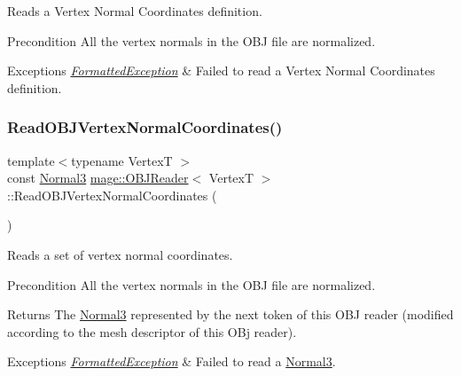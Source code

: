 Reads a Vertex Normal Coordinates definition.

\begin{DoxyPrecond}{Precondition}
All the vertex normals in the O\+BJ file are normalized. 
\end{DoxyPrecond}

\begin{DoxyExceptions}{Exceptions}
{\em \hyperlink{structmage_1_1_formatted_exception}{Formatted\+Exception}} & Failed to read a Vertex Normal Coordinates definition. \\
\hline
\end{DoxyExceptions}
\hypertarget{classmage_1_1_o_b_j_reader_a2be022b43cf2ad848c7a2d013b16e5f2}{}\label{classmage_1_1_o_b_j_reader_a2be022b43cf2ad848c7a2d013b16e5f2} 
\subsubsection{\texorpdfstring{Read\+O\+B\+J\+Vertex\+Normal\+Coordinates()}{ReadOBJVertexNormalCoordinates()}}
{\footnotesize\ttfamily template$<$typename VertexT $>$ \\
const \hyperlink{structmage_1_1_normal3}{Normal3} \hyperlink{classmage_1_1_o_b_j_reader}{mage\+::\+O\+B\+J\+Reader}$<$ VertexT $>$\+::Read\+O\+B\+J\+Vertex\+Normal\+Coordinates (\begin{DoxyParamCaption}{ }\end{DoxyParamCaption})\hspace{0.3cm}{\ttfamily [private]}}

Reads a set of vertex normal coordinates.

\begin{DoxyPrecond}{Precondition}
All the vertex normals in the O\+BJ file are normalized. 
\end{DoxyPrecond}
\begin{DoxyReturn}{Returns}
The {\ttfamily \hyperlink{structmage_1_1_normal3}{Normal3}} represented by the next token of this O\+BJ reader (modified according to the mesh descriptor of this O\+Bj reader). 
\end{DoxyReturn}

\begin{DoxyExceptions}{Exceptions}
{\em \hyperlink{structmage_1_1_formatted_exception}{Formatted\+Exception}} & Failed to read a {\ttfamily \hyperlink{structmage_1_1_normal3}{Normal3}}. \\
\hline
\end{DoxyExceptions}
\hypertarget{classmage_1_1_o_b_j_reader_ae0dfedd81f23e6e15725e9ef02dd3034}{}\label{classmage_1_1_o_b_j_reader_ae0dfedd81f23e6e15725e9ef02dd3034} 
